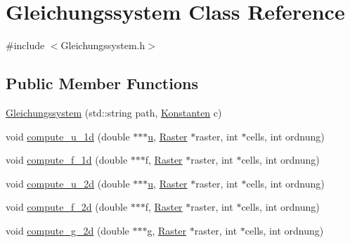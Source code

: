 \hypertarget{classGleichungssystem}{\section{Gleichungssystem Class Reference}
\label{classGleichungssystem}
}


{\ttfamily \#include $<$Gleichungssystem.\-h$>$}

\subsection*{Public Member Functions}
\begin{DoxyCompactItemize}
\item 
\hyperlink{classGleichungssystem_ad1913547ff7dadcbe736f55fd147a022}{Gleichungssystem} (std\-::string path, \hyperlink{classKonstanten}{Konstanten} c)
\item 
void \hyperlink{classGleichungssystem_a5e5b62e0de91210b360e5d2948711f2b}{compute\-\_\-u\-\_\-1d} (double $\ast$$\ast$$\ast$\hyperlink{classGleichungssystem_a38663ae62438b07378224efaf702048c}{u}, \hyperlink{classRaster}{Raster} $\ast$raster, int $\ast$cells, int ordnung)
\item 
void \hyperlink{classGleichungssystem_a7b2cf1ff16317a8c76168187c565d4c1}{compute\-\_\-f\-\_\-1d} (double $\ast$$\ast$$\ast$f, \hyperlink{classRaster}{Raster} $\ast$raster, int $\ast$cells, int ordnung)
\item 
void \hyperlink{classGleichungssystem_a7308592c55ca251bb1131637b8fdece4}{compute\-\_\-u\-\_\-2d} (double $\ast$$\ast$$\ast$\hyperlink{classGleichungssystem_a38663ae62438b07378224efaf702048c}{u}, \hyperlink{classRaster}{Raster} $\ast$raster, int $\ast$cells, int ordnung)
\item 
void \hyperlink{classGleichungssystem_a8a96d9253908b0db7bdafb1f08e52713}{compute\-\_\-f\-\_\-2d} (double $\ast$$\ast$$\ast$f, \hyperlink{classRaster}{Raster} $\ast$raster, int $\ast$cells, int ordnung)
\item 
void \hyperlink{classGleichungssystem_a2146afb8fbed763f65dba88a77eb633a}{compute\-\_\-g\-\_\-2d} (double $\ast$$\ast$$\ast$g, \hyperlink{classRaster}{Raster} $\ast$raster, int $\ast$cells, int ordnung)
\end{DoxyCompactItemize}
